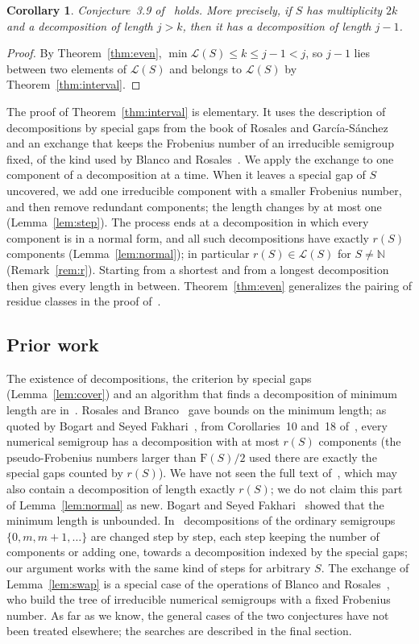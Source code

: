 \documentclass[11pt]{article}
\newtheorem{corollary}{Corollary}
\theoremstyle{definition}
\theoremstyle{remark}
\newcommand{\N}{\mathbb N}
\newcommand{\F}{\mathrm F}
\begin{document}
\begin{corollary}\label{cor:descent}
Conjecture~3.9 of~\cite{go} holds. More precisely, if $S$ has multiplicity
$2k$ and a decomposition of length $j>k$, then it has a decomposition of
length $j-1$.
\end{corollary}

\begin{proof}
By Theorem~\ref{thm:even}, $\min\mathcal L(S)\le k\le j-1<j$, so $j-1$ lies
between two elements of $\mathcal L(S)$ and belongs to $\mathcal L(S)$ by
Theorem~\ref{thm:interval}.
\end{proof}

The proof of Theorem~\ref{thm:interval} is elementary. It uses the
description of decompositions by special gaps from the book of Rosales and
García-Sánchez~\cite{rg} and an exchange that keeps the Frobenius number of
an irreducible semigroup fixed, of the kind used by Blanco and
Rosales~\cite{br}. We apply the exchange to one component of a decomposition
at a time. When it leaves a special gap of $S$ uncovered, we add one
irreducible component with a smaller Frobenius number, and then remove
redundant components; the length changes by at most one
(Lemma~\ref{lem:step}). The process ends at a decomposition in which every
component is in a normal form, and all such decompositions have exactly $r(S)$ components (Lemma~\ref{lem:normal});
in particular $r(S)\in\mathcal L(S)$ for $S\ne\N$ (Remark~\ref{rem:r}). Starting from a shortest and from
a longest decomposition then gives every length in between. Theorem~\ref{thm:even}
generalizes the pairing of residue classes in the proof
of~\cite[Theorem~3.5]{go}.

\subsection*{Prior work}
The existence of decompositions, the criterion by special gaps
(Lemma~\ref{lem:cover}) and an algorithm that finds a decomposition of
minimum length are in~\cite[Chapter~3, Section~4]{rg}. Rosales and
Branco~\cite{rb} gave bounds on the minimum length; as quoted by Bogart and
Seyed Fakhari~\cite[Theorem~2.1]{bsf}, from Corollaries~10 and~18
of~\cite{rb}, every numerical semigroup has a
decomposition with at most $r(S)$ components (the pseudo-Frobenius numbers
larger than $\F(S)/2$ used there are exactly the special gaps counted by
$r(S)$). We have not seen the full text of~\cite{rb}, which may also contain a
decomposition of length exactly $r(S)$; we do not claim this part of
Lemma~\ref{lem:normal} as new. Bogart and Seyed Fakhari~\cite{bsf} showed that
the minimum length is unbounded. In~\cite[Theorem~4.3]{go} decompositions of
the ordinary semigroups $\{0,m,m+1,\dots\}$ are changed step by step, each step
keeping the number of components or adding one, towards a decomposition
indexed by the special gaps; our argument works with the same kind of steps
for arbitrary $S$. The exchange of Lemma~\ref{lem:swap} is a special case of
the operations of Blanco and Rosales~\cite[Proposition~5]{br}, who build the
tree of irreducible numerical semigroups with a fixed Frobenius number. As far
as we know, the general cases of the two conjectures have not been treated
elsewhere; the searches are described in the final section.
\end{document}
